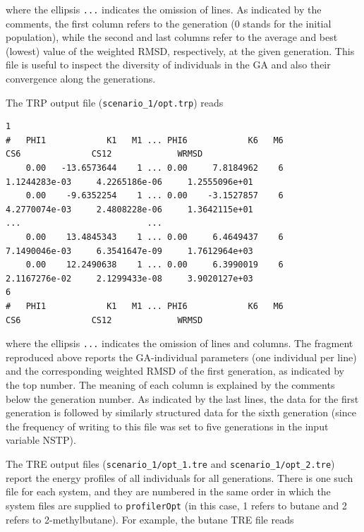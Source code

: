 \documentclass[10pt,a4paper,openany]{memoir}
\numberwithin{equation}{section}
\newcommand{\under}{\_}
\newcommand{\profileropt}[0]{\texttt{profilerOpt}}
\begin{document}
\noindent where the ellipsis \texttt{...} indicates the omission of
lines.
%
As indicated by the comments, the first column refers to the
generation (0 stands for the initial population), while the second and
last columns refer to the average and best (lowest) value of the
weighted RMSD, respectively, at the given generation.
%
This file is useful to inspect the diversity of individuals in the GA
and also their convergence along the generations.

The TRP output file (\texttt{scenario\under{}1/opt.trp}) reads

\begin{lstlisting}
1    
#   PHI1            K1   M1 ... PHI6            K6   M6               CS6              CS12             WRMSD
    0.00   -13.6573644    1 ... 0.00     7.8184962    6     1.1244283e-03     4.2265186e-06     1.2555096e+01
    0.00    -9.6352254    1 ... 0.00    -3.1527857    6     4.2770074e-03     2.4808228e-06     1.3642115e+01
...                         ...
    0.00    13.4845343    1 ... 0.00     6.4649437    6     7.1490046e-03     6.3541647e-09     1.7612964e+03
    0.00    12.2490638    1 ... 0.00     6.3990019    6     2.1167276e-02     2.1299433e-08     3.9020127e+03
6    
#   PHI1            K1   M1 ... PHI6            K6   M6               CS6              CS12             WRMSD
\end{lstlisting}\vspace{1ex}\par

\noindent where the ellipsis \texttt{...} indicates the omission of
lines and columns.
%
The fragment reproduced above reports the GA-individual parameters
(one individual per line) and the corresponding weighted RMSD of the
first generation, as indicated by the top number.
%
The meaning of each column is explained by the comments below the
generation number.
%
As indicated by the last lines, the data for the first generation is
followed by similarly structured data for the sixth generation (since
the frequency of writing to this file was set to five generations in
the input variable NSTP).
%

The TRE output files (\texttt{scenario\under{}1/opt\under{}1.tre} and
\texttt{scenario\under{}1/opt\under{}2.tre}) report the energy
profiles of all individuals for all generations.
%
There is one such file for each system, and they are numbered in the
same order in which the system files are supplied to \profileropt{}
(in this case, 1 refers to butane and 2 refers to 2-methylbutane).
%
For example, the butane TRE file reads
\end{document}
